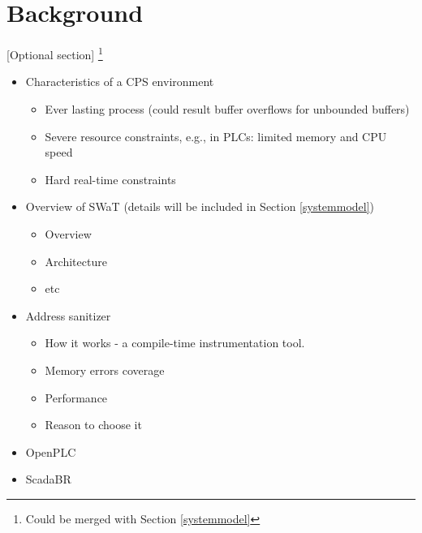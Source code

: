 \documentclass{acm_proc_article-sp}
\begin{document}
\section{Background}\label{background}
\hspace{1cm} [Optional section] \footnote{Could be merged with Section \ref{systemmodel}}
\begin{itemize}
\item Characteristics of a CPS environment
\begin{itemize}
\item Ever lasting process (could result buffer overflows for unbounded buffers)
\item Severe resource constraints, e.g., in PLCs: limited memory and CPU speed
\item Hard real-time constraints
\end{itemize}
\item Overview of SWaT (details will be included in Section \ref{systemmodel})
\begin{itemize}
\item Overview
\item Architecture
\item etc
\end{itemize}
\item Address sanitizer
\begin{itemize}
\item How it works - a compile-time instrumentation tool.
\item Memory errors coverage
\item Performance
\item Reason to choose it
\end{itemize}
\item OpenPLC
\item ScadaBR
\end{itemize}
\end{document}
